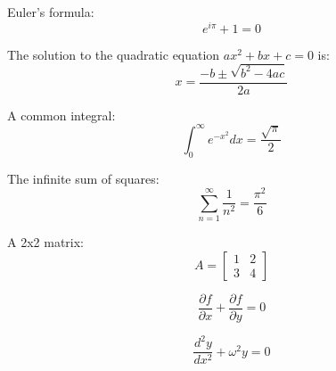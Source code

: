 \documentclass{article}
\begin{document}
Euler's formula:
\[
e^{i\pi} + 1 = 0
\]

The solution to the quadratic equation \( ax^2 + bx + c = 0 \) is:
\[
x = \frac{-b \pm \sqrt{b^2 - 4ac}}{2a}
\]

A common integral:
\[
\int_0^\infty e^{-x^2} dx = \frac{\sqrt{\pi}}{2}
\]

The infinite sum of squares:
\[
\sum_{n=1}^{\infty} \frac{1}{n^2} = \frac{\pi^2}{6}
\]

A 2x2 matrix:
\[
A = \begin{bmatrix} 1 & 2 \\ 3 & 4 \end{bmatrix}
\]

\[
\frac{\partial f}{\partial x} + \frac{\partial f}{\partial y} = 0
\]

\[
\frac{d^2y}{dx^2} + \omega^2 y = 0
\]
\end{document}

